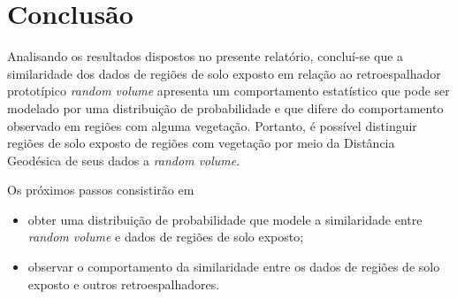 \documentclass[12pt]{article}
\begin{document}
\section{Conclusão}

Analisando os resultados dispostos no presente relatório, concluí-se que a similaridade dos dados de regiões de solo exposto em relação ao retroespalhador prototípico \textit{random volume} apresenta um comportamento estatístico que pode ser modelado por uma distribuição de probabilidade e que difere do comportamento observado em regiões com alguma vegetação. Portanto, é possível distinguir regiões de solo exposto de regiões com vegetação por meio da Distância Geodésica de seus dados a \textit{random volume}.

Os próximos passos consistirão em
\begin{itemize}
  \item obter uma distribuição de probabilidade que modele a similaridade entre \textit{random volume} e dados de regiões de solo exposto;
  \item observar o comportamento da similaridade entre os dados de regiões de solo exposto e outros retroespalhadores.
\end{itemize}
\end{document}
